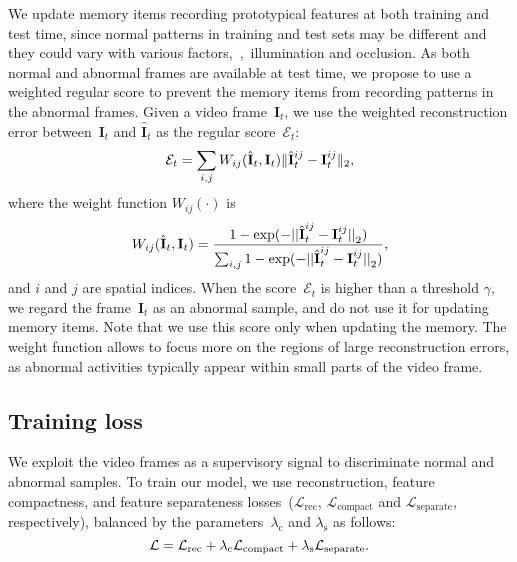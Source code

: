 \documentclass[10pt,twocolumn,letterpaper]{article}
\begin{document}
We update memory items recording prototypical features at both training and test time, since normal patterns in training and test sets may be different and they could vary with various factors,~\eg,~illumination and occlusion. As both normal and abnormal frames are available at test time, we propose to use a weighted regular score to prevent the memory items from recording patterns in the abnormal frames. Given a video frame~${\mathbf{I}}_t$, we use the weighted reconstruction error between~${\mathbf{I}}_t$ and $\hat{\mathbf{I}}_t$ as the regular score~$\mathcal{E}_t$: 
			\begin{equation}\label{eq:pseudo_score}
\vspace{-0.1cm}
				\mathcal{E}_t=  \sum_{i, j} W_{ij}(\hat{\mathbf{I}}_t,  \mathbf{I}_t) \|\hat{\mathbf{I}}^{ij}_t-\mathbf{I}^{ij}_t\|_2,
\vspace{-0.1cm}
			\end{equation}
	where the weight function $W_{ij}(\cdot)$ is
			\begin{equation}\label{eq:weight_function}
\vspace{-0.1cm}
				W_{ij}(\hat{\textbf{I}}_t, \textbf{I}_t) = {1-\exp(-{{||\hat{\textbf{I}}^{ij}_t-\textbf{I}^{ij}_t||}_2})\over{\sum_{i, j} 1-\exp(-{{||\hat{\textbf{I}}^{ij}_t-\textbf{I}^{ij}_t||}_2)}}},
\vspace{-0.1cm}
			\end{equation}
and $i$ and $j$ are spatial indices. When the score~$\mathcal{E}_t$ is higher than a threshold $\gamma$, we regard the frame~$\mathbf{I}_t$ as an abnormal sample, and do not use it for updating memory items. Note that we use this score only when updating the memory. The weight function allows to focus more on the regions of large reconstruction errors, as abnormal activities typically appear within small parts of the video frame.



		\vspace{-0.1cm}
	\subsection{Training loss} \label{sec:loss}
\vspace{-0.1cm}
		We exploit the video frames as a supervisory signal to discriminate normal and abnormal samples. To train our model, we use reconstruction, feature compactness, and feature separateness losses~($\mathcal{L}_\mathrm{rec}$, $\mathcal{L}_\mathrm{compact}$ and $\mathcal{L}_\mathrm{separate}$, respectively), balanced by the parameters~$\lambda_\mathrm{c}$ and $\lambda_\mathrm{s}$ as follows:
		\begin{equation}
\vspace{-0.15cm}
				\mathcal{L} = \mathcal{L}_\mathrm{rec} + \lambda_\mathrm{c}\mathcal{L}_\mathrm{compact} + \lambda_\mathrm{s}\mathcal{L}_\mathrm{separate}.
\vspace{-0.1cm}
			\end{equation}
\end{document}
